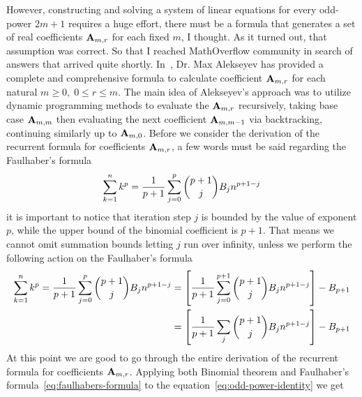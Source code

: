However, constructing and solving a system of linear equations for every odd-power $2m+1$ requires a huge effort,
there must be a formula that generates a set of real coefficients ${\mathbf{A}} \sb{m,r}$ for each fixed $m$, I thought.
As it turned out, that assumption was correct.
So that I reached MathOverflow community in search of answers that arrived quite shortly.
In~\cite{alekseyev2018mathoverflow}, Dr. Max Alekseyev has provided a complete and comprehensive formula to calculate
coefficient ${\mathbf{A}} \sb{m,r}$ for each natural $m\geq 0, \; 0 \leq r \leq m$.
The main idea of Alekseyev's approach was to utilize dynamic programming methods to evaluate the ${\mathbf{A}} \sb{m,r}$ recursively,
taking base case ${\mathbf{A}} \sb{m,m}$ then evaluating the next coefficient ${\mathbf{A}} \sb{m,m-1}$ via backtracking,
continuing similarly up to ${\mathbf{A}} \sb{m,0}$.
Before we consider the derivation of the recurrent formula for coefficients ${\mathbf{A}} \sb{m,r}$,
a few words must be said regarding the Faulhaber's formula~\cite{beardon1996sums}
\begin{equation*}
    \sum_{k=1}^{n} k^{p} = \frac{1}{p+1}\sum_{j=0}^{p} \binom{p+1}{j} {B}\sb{j} n^{p+1-j}
\end{equation*}
it is important to notice that iteration step $j$ is bounded by the value of exponent $p$,
while the upper bound of the binomial coefficient is $p+1$.
That means we cannot omit summation bounds letting $j$ run over infinity,
unless we perform the following action on the Faulhaber's formula
\begin{equation}
    \begin{split}
        \sum_{k=1}^{n} k^{p}
        = \frac{1}{p+1}\sum_{j=0}^{p} \binom{p+1}{j} {B}\sb{j} n^{p+1-j}
        &= \left[ \frac{1}{p+1}\sum_{j=0}^{p+1} \binom{p+1}{j} {B}\sb{j} n^{p+1-j} \right] - {B}\sb{p+1} \\
        &= \left[ \frac{1}{p+1}\sum_{j} \binom{p+1}{j} {B}\sb{j} n^{p+1-j} \right] - {B}\sb{p+1}
    \end{split}\label{eq:faulhabers-formula}
\end{equation}
At this point we are good to go through the entire derivation of the recurrent formula for
coefficients ${\mathbf{A}} \sb{m,r}$.
Applying both Binomial theorem and Faulhaber's formula~\eqref{eq:faulhabers-formula}
to the equation~\eqref{eq:odd-power-identity} we get
